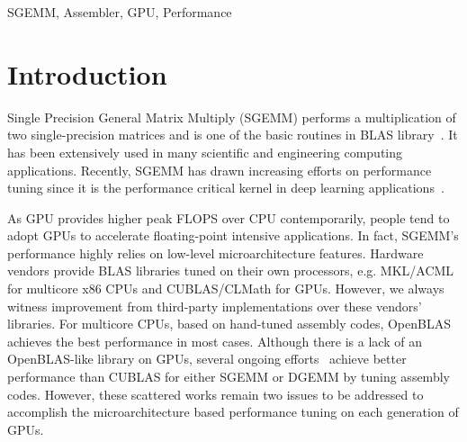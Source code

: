 \documentclass{sig-alternate-05-2015}
\begin{document}
\keywords
SGEMM, Assembler, GPU, Performance

\section{Introduction}
Single Precision General Matrix Multiply (SGEMM) performs a multiplication of two single-precision matrices and is one of the basic routines in BLAS library~\cite{blas}. It has been extensively used in many scientific and engineering computing applications. Recently, SGEMM has drawn increasing efforts on performance tuning since it is the performance critical kernel in deep learning applications~\cite{}.

As GPU provides higher peak FLOPS over CPU contemporarily, people tend to adopt GPUs to accelerate floating-point
intensive applications. In fact, SGEMM's performance highly relies on low-level microarchitecture features. Hardware
vendors provide BLAS libraries tuned on their own processors, e.g. MKL/ACML for multicore x86 CPUs and CUBLAS/CLMath for
GPUs. However, we always witness improvement from third-party implementations over these vendors' libraries. For
multicore CPUs, based on hand-tuned assembly codes, OpenBLAS~\cite{} achieves the best performance in most cases.
Although there is a lack of an OpenBLAS-like library on GPUs, several ongoing efforts~\cite{tan,lai,nervana_sgemm_wiki,
chien, volkov} achieve better performance than CUBLAS for either SGEMM or DGEMM by tuning assembly codes. However, these scattered works remain two issues to be addressed to accomplish the microarchitecture based performance tuning on each generation of GPUs.
\end{document}
